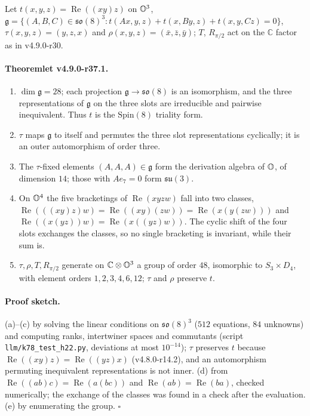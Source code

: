 Let \(t(x,y,z)=\operatorname{Re}((xy)z)\) on \(\mathbb{O}^3\),
\(\mathfrak g=\{(A,B,C)\in\mathfrak{so}(8)^3: t(Ax,y,z)+t(x,By,z)+t(x,y,Cz)=0\}\), \(\tau(x,y,z)=(y,z,x)\) and
\(\rho(x,y,z)=(\bar x,\bar z,\bar y)\); \(T\), \(R_{\pi/2}\) act on the \(\mathbb C\) factor as in v4.9.0-r30.

\paragraph{Theoremlet v4.9.0-r37.1.}
\begin{enumerate}[leftmargin=2em]
\item[(a)] \(\dim\mathfrak g=28\); each projection \(\mathfrak g\to\mathfrak{so}(8)\) is an isomorphism, and the three representations
of \(\mathfrak g\) on the three slots are irreducible and pairwise inequivalent.  Thus \(t\) is the \(\mathrm{Spin}(8)\) triality form.
\item[(b)] \(\tau\) maps \(\mathfrak g\) to itself and permutes the three slot representations cyclically; it is an outer
automorphism of order three.
\item[(c)] The \(\tau\)-fixed elements \((A,A,A)\in\mathfrak g\) form the derivation algebra of \(\mathbb{O}\), of dimension \(14\); those
with \(Ae_7=0\) form \(\mathfrak{su}(3)\).
\item[(d)] On \(\mathbb{O}^4\) the five bracketings of \(\operatorname{Re}(xyzw)\) fall into two classes,
\(\operatorname{Re}(((xy)z)w)=\operatorname{Re}((xy)(zw))=\operatorname{Re}(x(y(zw)))\) and
\(\operatorname{Re}((x(yz))w)=\operatorname{Re}(x((yz)w))\).  The cyclic shift of the four slots exchanges the classes, so no single
bracketing is invariant, while their sum is.
\item[(e)] \(\tau,\rho,T,R_{\pi/2}\) generate on \(\mathbb C\otimes\mathbb{O}^3\) a group of order \(48\), isomorphic to \(S_3\times D_4\), with
element orders \(1,2,3,4,6,12\); \(\tau\) and \(\rho\) preserve \(t\).
\end{enumerate}

\paragraph{Proof sketch.}
(a)--(c) by solving the linear conditions on \(\mathfrak{so}(8)^3\) (\(512\) equations, \(84\) unknowns) and computing ranks,
intertwiner spaces and commutants (script \texttt{llm/k78\_test\_h22.py}, deviations at most \(10^{-14}\)); \(\tau\) preserves \(t\)
because \(\operatorname{Re}((xy)z)=\operatorname{Re}((yz)x)\) (v4.8.0-r14.2), and an automorphism permuting inequivalent
representations is not inner.  (d) from \(\operatorname{Re}((ab)c)=\operatorname{Re}(a(bc))\) and \(\operatorname{Re}(ab)=\operatorname{Re}(ba)\),
checked numerically; the exchange of the classes was found in a check after the evaluation.  (e) by enumerating the group.
\(\square\)

